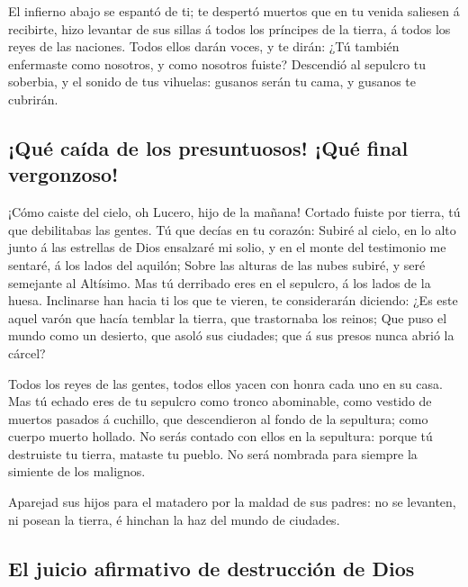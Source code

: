  El infierno abajo se espantó de ti; te despertó muertos
que en tu venida saliesen á recibirte, hizo levantar de sus sillas á
todos los príncipes de la tierra, á todos los reyes de las naciones.
 Todos ellos darán voces, y te dirán: ¿Tú también
enfermaste como nosotros, y como nosotros fuiste? 
Descendió al sepulcro tu soberbia, y el sonido de tus vihuelas: gusanos
serán tu cama, y gusanos te cubrirán.

\hypertarget{quuxe9-cauxedda-de-los-presuntuosos-quuxe9-final-vergonzoso}{%
\subsection{¡Qué caída de los presuntuosos! ¡Qué final
vergonzoso!}\label{quuxe9-cauxedda-de-los-presuntuosos-quuxe9-final-vergonzoso}}

 ¡Cómo caiste del cielo, oh Lucero, hijo de la mañana!
Cortado fuiste por tierra, tú que debilitabas las gentes.
 Tú que decías en tu corazón: Subiré al cielo, en lo alto
junto á las estrellas de Dios ensalzaré mi solio, y en el monte del
testimonio me sentaré, á los lados del aquilón;  Sobre
las alturas de las nubes subiré, y seré semejante al Altísimo.
 Mas tú derribado eres en el sepulcro, á los lados de la
huesa.  Inclinarse han hacia ti los que te vieren, te
considerarán diciendo: ¿Es este aquel varón que hacía temblar la tierra,
que trastornaba los reinos;  Que puso el mundo como un
desierto, que asoló sus ciudades; que á sus presos nunca abrió la
cárcel?

 Todos los reyes de las gentes, todos ellos yacen con
honra cada uno en su casa.  Mas tú echado eres de tu
sepulcro como tronco abominable, como vestido de muertos pasados á
cuchillo, que descendieron al fondo de la sepultura; como cuerpo muerto
hollado.  No serás contado con ellos en la sepultura:
porque tú destruiste tu tierra, mataste tu pueblo. No será nombrada para
siempre la simiente de los malignos.

 Aparejad sus hijos para el matadero por la maldad de sus
padres: no se levanten, ni posean la tierra, é hinchan la haz del mundo
de ciudades.

\hypertarget{el-juicio-afirmativo-de-destrucciuxf3n-de-dios}{%
\subsection{El juicio afirmativo de destrucción de
Dios}\label{el-juicio-afirmativo-de-destrucciuxf3n-de-dios}}

